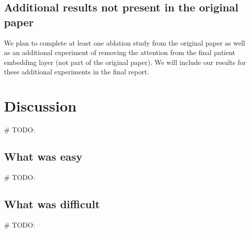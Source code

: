 \documentclass[11pt,a4paper,fleqn]{article}
\begin{document}
\subsection{Additional results not present in the original paper}
We plan to complete at least one ablation study from the original paper as well
as an additional experiment of removing the attention from the final patient
embedding layer (not part of the original paper). We will include our results
for these additional experiments in the final report.

\section{Discussion}
\# TODO:


\subsection{What was easy}
\# TODO:


\subsection{What was difficult}
\# TODO:
\end{document}
